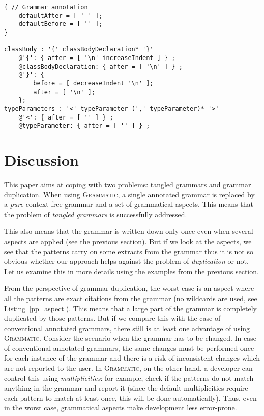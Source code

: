 \documentclass{IOS-Book-Article}     %
\newcommand{\lstref}[1]{Listing~\ref{#1}}
\newcommand{\tool}[1]{\textsc{#1}}
\newcommand{\Grammatic}[0]{\tool{Grammatic}}
\begin{document}
\begin{lstlisting}[language=Grammatic,caption=Pretty-printing aspect for class declarations in Java,label=pp_aspect,float]
{ // Grammar annotation
	defaultAfter = [ ' ' ]; 
	defaultBefore = [ '' ];
} 
	
classBody : '{' classBodyDeclaration* '}'
	@'{': { after = [ '\n' increaseIndent ] } ;
	@classBodyDeclaration: { after = [ '\n' ] } ;
	@'}': {
		before = [ decreaseIndent '\n' ];
		after = [ '\n' ];
	};
typeParameters : '<' typeParameter (',' typeParameter)* '>' 
	@'<': { after = [ '' ] } ;
	@typeParameter: { after = [ '' ] } ;
\end{lstlisting}

\section{Discussion}\label{Discussion}

This paper aims at coping with two problems: tangled grammars and grammar duplication. 
When using \Grammatic{}, a single annotated grammar is replaced by a \emph{pure} context-free grammar and a set of grammatical aspects. This means that the problem of \emph{tangled grammars} is successfully addressed.

This also means that the grammar is written down only once even when several aspects are applied (see the previous section). But if we look at the aspects, we see that the patterns carry on some extracts from the grammar thus it is not so obvious whether our approach helps against the problem of \emph{duplication} or not. Let us examine this in more details using the examples from the previous section.

From the perspective of grammar duplication, the worst case is an aspect where all the patterns are exact citations from the grammar (no wildcards are used, see \lstref{pp_aspect}). This means that a large part of the grammar is completely duplicated by those patterns. But if we compare this with the case of conventional annotated grammars, there still is at least one advantage of using \Grammatic{}. Consider the scenario when the grammar has to be changed. In case of conventional annotated grammars, the same changes must be performed once for each instance of the grammar and there is a risk of inconsistent changes which are not reported to the user. In \Grammatic{}, on the other hand, a developer can control this using \emph{multiplicities}: for example, check if the patterns do not match anything in the grammar and report it (since the default multiplicities require each pattern to match at least once, this will be done automatically). Thus, even in the worst case, grammatical aspects make development less error-prone.
\end{document}

